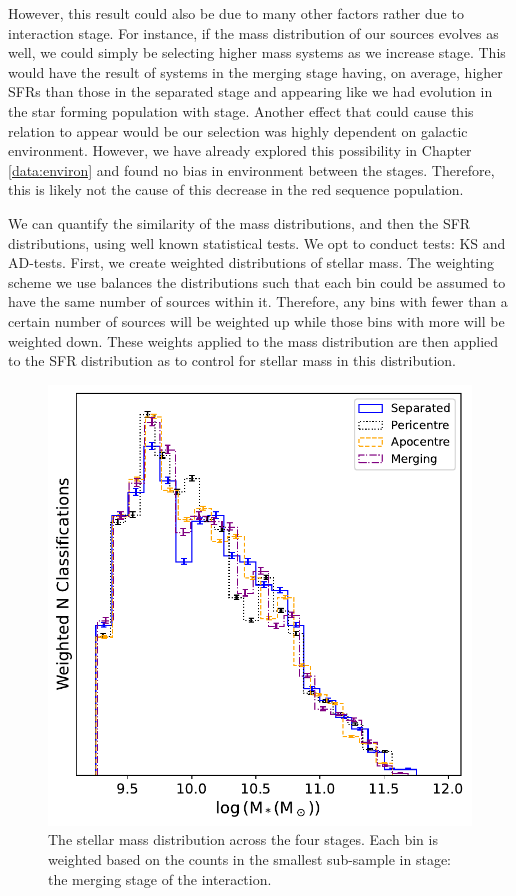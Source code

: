 However, this result could also be due to many other factors rather due to interaction stage. For instance, if the mass distribution of our sources evolves as well, we could simply be selecting higher mass systems as we increase stage. This would have the result of systems in the merging stage having, on average, higher SFRs than those in the separated stage and appearing like we had evolution in the star forming population with stage. Another effect that could cause this relation to appear would be our selection was highly dependent on galactic environment. However, we have already explored this possibility in Chapter \ref{data:environ} and found no bias in environment between the stages. Therefore, this is likely not the cause of this decrease in the red sequence population.

We can quantify the similarity of the mass distributions, and then the SFR distributions, using well known statistical tests. We opt to conduct tests: KS and AD-tests. First, we create weighted distributions of stellar mass. The weighting scheme we use balances the distributions such that each bin could be assumed to have the same number of sources within it. Therefore, any bins with fewer than a certain number of sources will be weighted up while those bins with more will be weighted down. These weights applied to the mass distribution are then applied to the SFR distribution as to control for stellar mass in this distribution.

\begin{figure}
\centering
\includegraphics[width = \textwidth]{Chapter3/figures/stellar-mass-dist.pdf}
\caption[The stellar mass distribution across the four stages.]{The stellar mass distribution across the four stages. Each bin is weighted based on the counts in the smallest sub-sample in stage: the merging stage of the interaction.}
\label{fig:weighted-mass}
\end{figure}

